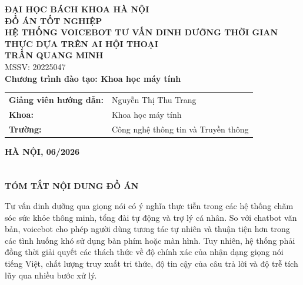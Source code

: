 \documentclass[a4paper,13pt,oneside]{report}
\def\TITLE{HỆ THỐNG VOICEBOT TƯ VẤN DINH DƯỠNG THỜI GIAN THỰC DỰA TRÊN AI HỘI THOẠI}
\def\AUTHOR{TRẦN QUANG MINH}
\def\STUDENTID{20225047}
\def\PROGRAM{Chương trình đào tạo: Khoa học máy tính}
\def\FACULTY{Khoa học máy tính}
\def\SCHOOL{Công nghệ thông tin và Truyền thông}
\def\UNIVERSITY{ĐẠI HỌC BÁCH KHOA HÀ NỘI}
\def\SUPERVISOR{Nguyễn Thị Thu Trang}
\begin{document}
\begin{titlepage}
    \thispagestyle{empty}
    \begin{center}
        {\textbf{\Large \UNIVERSITY}}\\[4.2cm]

        {\textbf{\fontsize{30}{36}\selectfont ĐỒ ÁN TỐT NGHIỆP}}\\[1.0cm]
        {\textbf{\LARGE \TITLE}}\\[1.3cm]

        {\textbf{\Large \AUTHOR}}\\[-0.1cm]
        {\Large MSSV: \STUDENTID}\\[0.8cm]
        {\textbf{\Large \PROGRAM}}\\[4.0cm]

        {\Large
        \begin{tabular}{p{6.0cm}p{8.0cm}}
            \textbf{Giảng viên hướng dẫn:} & \SUPERVISOR \\[0.6cm]
            \textbf{Khoa:}                 & \FACULTY    \\[0.6cm]
            \textbf{Trường:}               & \SCHOOL     \\[3.8cm]
        \end{tabular}
        }

        {\textbf{\Large HÀ NỘI, 06/2026}}
    \end{center}
\end{titlepage}

\fontsize{15pt}{20pt}\selectfont
\justifying

\chapter*{}
\vspace*{-1.8cm}
\begin{center}
    {\textbf{\LARGE TÓM TẮT NỘI DUNG ĐỒ ÁN}}
\end{center}
\vspace{1.0cm}

Tư vấn dinh dưỡng qua giọng nói có ý nghĩa thực tiễn trong các hệ thống chăm sóc sức khỏe thông minh, tổng đài tự động và trợ lý cá nhân. So với chatbot văn bản, voicebot cho phép người dùng tương tác tự nhiên và thuận tiện hơn trong các tình huống khó sử dụng bàn phím hoặc màn hình. Tuy nhiên, hệ thống phải đồng thời giải quyết các thách thức về độ chính xác của nhận dạng giọng nói tiếng Việt, chất lượng truy xuất tri thức, độ tin cậy của câu trả lời và độ trễ tích lũy qua nhiều bước xử lý.
\end{document}
